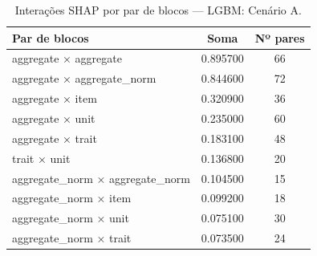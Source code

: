 \begin{table}[htbp]
\caption{Interações SHAP por par de blocos — LGBM: Cenário A.}
\label{tab:intlgbm_A}
\centering
\small
\begin{tabular}{lcc}
\toprule
Par de blocos & Soma & Nº pares \\
\midrule
aggregate × aggregate & 0.895700 & 66 \\
aggregate × aggregate\_norm & 0.844600 & 72 \\
aggregate × item & 0.320900 & 36 \\
aggregate × unit & 0.235000 & 60 \\
aggregate × trait & 0.183100 & 48 \\
trait × unit & 0.136800 & 20 \\
aggregate\_norm × aggregate\_norm & 0.104500 & 15 \\
aggregate\_norm × item & 0.099200 & 18 \\
aggregate\_norm × unit & 0.075100 & 30 \\
aggregate\_norm × trait & 0.073500 & 24 \\
\bottomrule
\end{tabular}
\end{table}
